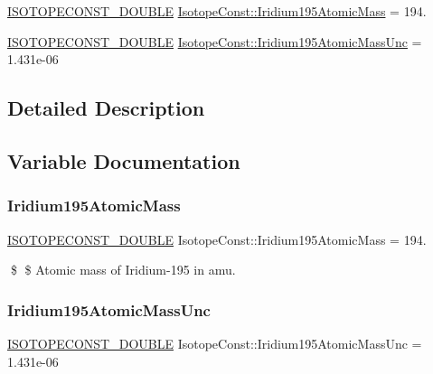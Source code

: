\begin{DoxyCompactItemize}
\item 
\mbox{\hyperlink{group___isotope_const-_macros_ga8f45a7272ce02c0b4c65c44636ed719a}{I\+S\+O\+T\+O\+P\+E\+C\+O\+N\+S\+T\+\_\+\+D\+O\+U\+B\+LE}} \mbox{\hyperlink{group___isotope_const-_iridium-_ir195_ga3fcc1942e424cfe214904e750463320e}{Isotope\+Const\+::\+Iridium195\+Atomic\+Mass}} = 194.
\item 
\mbox{\hyperlink{group___isotope_const-_macros_ga8f45a7272ce02c0b4c65c44636ed719a}{I\+S\+O\+T\+O\+P\+E\+C\+O\+N\+S\+T\+\_\+\+D\+O\+U\+B\+LE}} \mbox{\hyperlink{group___isotope_const-_iridium-_ir195_gac711dd348ce7c536c8b0ed38011bc4ed}{Isotope\+Const\+::\+Iridium195\+Atomic\+Mass\+Unc}} = 1.\+431e-\/06
\end{DoxyCompactItemize}


\subsection{Detailed Description}


\subsection{Variable Documentation}
\mbox{\label{group___isotope_const-_iridium-_ir195_ga3fcc1942e424cfe214904e750463320e}} 
\subsubsection{\texorpdfstring{Iridium195\+Atomic\+Mass}{Iridium195AtomicMass}}
{\footnotesize\ttfamily \mbox{\hyperlink{group___isotope_const-_macros_ga8f45a7272ce02c0b4c65c44636ed719a}{I\+S\+O\+T\+O\+P\+E\+C\+O\+N\+S\+T\+\_\+\+D\+O\+U\+B\+LE}} Isotope\+Const\+::\+Iridium195\+Atomic\+Mass = 194.}

\$ \$ Atomic mass of Iridium-\/195 in amu. \mbox{\label{group___isotope_const-_iridium-_ir195_gac711dd348ce7c536c8b0ed38011bc4ed}} 
\subsubsection{\texorpdfstring{Iridium195\+Atomic\+Mass\+Unc}{Iridium195AtomicMassUnc}}
{\footnotesize\ttfamily \mbox{\hyperlink{group___isotope_const-_macros_ga8f45a7272ce02c0b4c65c44636ed719a}{I\+S\+O\+T\+O\+P\+E\+C\+O\+N\+S\+T\+\_\+\+D\+O\+U\+B\+LE}} Isotope\+Const\+::\+Iridium195\+Atomic\+Mass\+Unc = 1.\+431e-\/06}

